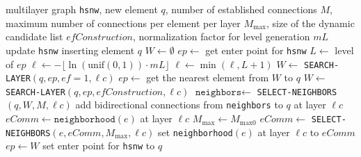 \begin{algorithm}[H]
\caption{INSERT(\texttt{hsnw}, $q$, $M$, $M_{\text{max}}$, ${efConstruction}$, $mL$)}\label{alg:insert}
\begin{algorithmic}[1]
\Require multilayer graph \texttt{hsnw}, new element $q$, number of established connections $M$, maximum number of connections per element per layer $M_{\text{max}}$, size of the dynamic candidate list ${efConstruction}$, normalization factor for level generation $mL$
\Ensure update \texttt{hsnw} inserting element $q$
\State $W \gets \emptyset$ 
\State $ep \gets$ get enter point for \texttt{hsnw}
\State $L \gets$ level of $ep$ 
\State $\ell \gets -\lfloor \ln(\text{unif}(0,1)) \cdot mL \rfloor$ 
\State $\ell \gets \min(\ell, L + 1)$
    \State $W \gets$ \texttt{SEARCH-LAYER}$(q, ep, {ef}=1, \ell{c})$
    \State $ep \gets$ get the nearest element from $W$ to $q$
\EndFor
{}
    \State $W \gets$ \texttt{SEARCH-LAYER}$(q, ep, {efConstruction}, \ell{c})$
    \State $\texttt{neighbors} \gets$ \texttt{SELECT-NEIGHBORS}$(q, W, M, \ell{c})$ 
    \State add bidirectional connections from \texttt{neighbors} to $q$ at layer $\ell{c}$
        \State $eComm \gets \texttt{neighborhood}(e)$ at layer $\ell{c}$
         
             
                \State $M_{\text{max}} \gets M_{\text{max}0}$
            \EndIf
            \State $eComm \gets$ \texttt{SELECT-NEIGHBORS}$(e, eComm, M_{\text{max}}, \ell{c})$ 
        \EndIf
        \State set \texttt{neighborhood}$(e)$ at layer $\ell{c}$ to $eComm$
    \EndFor
\EndFor
\State $ep \gets W$
\State set enter point for \texttt{hsnw} to $q$
\end{algorithmic}
\end{algorithm}